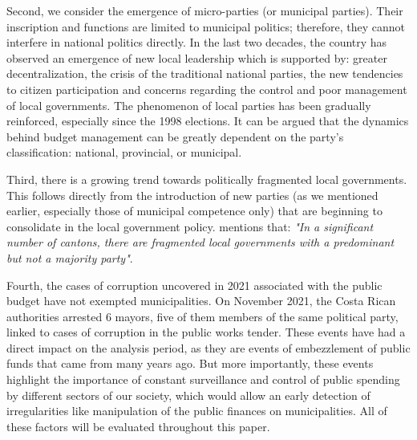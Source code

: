 Second, we consider the emergence of micro-parties (or municipal parties). Their inscription and functions are limited to municipal politics; therefore, they cannot interfere in national politics directly. In the last two decades, the country has observed an emergence of new local leadership which is supported by: greater decentralization, the crisis of the traditional national parties, the new tendencies to citizen participation and concerns regarding the control and poor management of local governments. \parencite[p. 165]{blanco2011} The phenomenon of local parties has been gradually reinforced, especially since the 1998 elections. \parencite[p. 15]{beers2006} It can be argued that the dynamics behind budget management can be greatly dependent on the party's classification: national, provincial, or municipal. 

Third, there is a growing trend towards politically fragmented local governments. This follows directly from the introduction of new parties (as we mentioned earlier, especially those of municipal competence only) that are beginning to consolidate in the local government policy. \textcite{blanco2011} mentions that: \textit{"In a significant number of cantons, there are fragmented local governments with a predominant but not a majority party"}.  

Fourth, the cases of corruption uncovered in 2021 associated with the public budget have not exempted municipalities. On November 2021, the Costa Rican authorities arrested 6 mayors, five of them members of the same political party, linked to cases of corruption in the public works tender. \parencite{molina2021} These events have had a direct impact on the analysis period, as they are events of embezzlement of public funds that came from many years ago. But more importantly, these events highlight the importance of constant surveillance and control of public spending by different sectors of our society, which would allow an early detection of irregularities like manipulation of the public finances on municipalities. All of these factors will be evaluated throughout this paper. 
